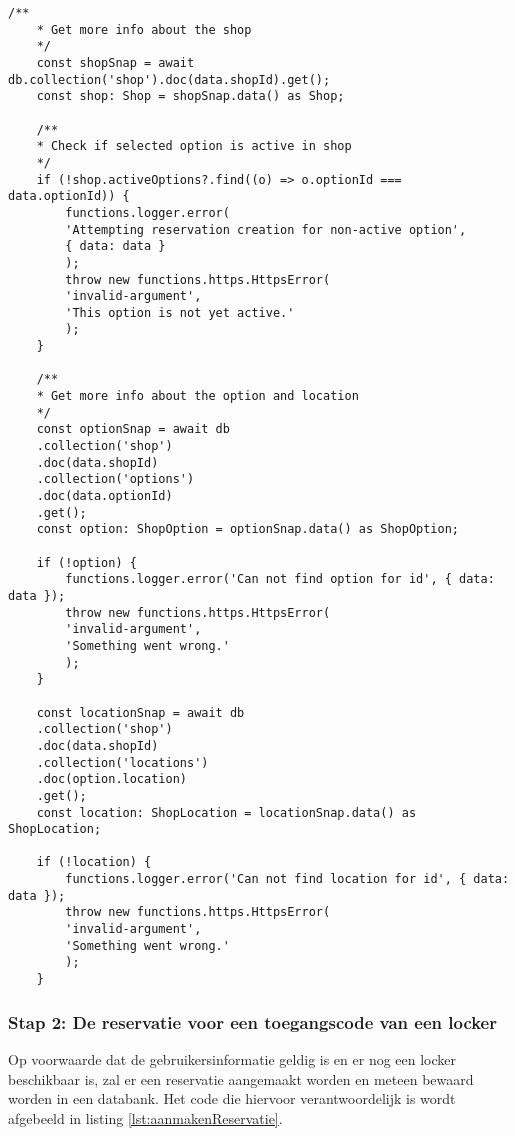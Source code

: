 \begin{lstlisting}[caption={Het informatie ophalen van de geselecteerde locatie. Aan de hand van geselecteerde evenement kan er gegevens uit de databank gehaald worden.}, label={lst:ophalenEventInfo}]
    /**
    * Get more info about the shop
    */
    const shopSnap = await db.collection('shop').doc(data.shopId).get();
    const shop: Shop = shopSnap.data() as Shop;
    
    /**
    * Check if selected option is active in shop
    */
    if (!shop.activeOptions?.find((o) => o.optionId === data.optionId)) {
        functions.logger.error(
        'Attempting reservation creation for non-active option',
        { data: data }
        );
        throw new functions.https.HttpsError(
        'invalid-argument',
        'This option is not yet active.'
        );
    }
    
    /**
    * Get more info about the option and location
    */
    const optionSnap = await db
    .collection('shop')
    .doc(data.shopId)
    .collection('options')
    .doc(data.optionId)
    .get();
    const option: ShopOption = optionSnap.data() as ShopOption;
    
    if (!option) {
        functions.logger.error('Can not find option for id', { data: data });
        throw new functions.https.HttpsError(
        'invalid-argument',
        'Something went wrong.'
        );
    }
    
    const locationSnap = await db
    .collection('shop')
    .doc(data.shopId)
    .collection('locations')
    .doc(option.location)
    .get();
    const location: ShopLocation = locationSnap.data() as ShopLocation;
    
    if (!location) {
        functions.logger.error('Can not find location for id', { data: data });
        throw new functions.https.HttpsError(
        'invalid-argument',
        'Something went wrong.'
        );
    }
\end{lstlisting}

\subsubsection{Stap 2: De reservatie voor een toegangscode van een locker}%
Op voorwaarde dat de gebruikersinformatie geldig is en er nog een locker beschikbaar is, zal er een reservatie aangemaakt worden en meteen bewaard worden in een databank. Het code die hiervoor verantwoordelijk is wordt afgebeeld in listing \ref{lst:aanmakenReservatie}.


